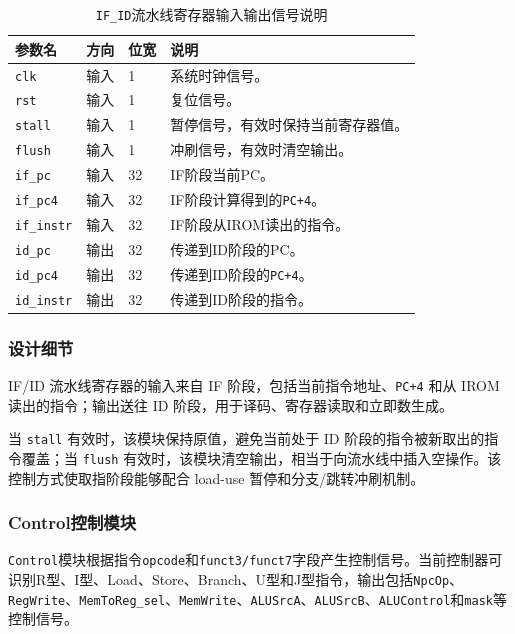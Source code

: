 \documentclass[12pt,a4paper]{ctexart}
\newcommand{\code}[1]{\texttt{#1}}
\begin{document}
\begin{table}[H]
\centering
\caption{\code{IF\_ID}流水线寄存器输入输出信号说明}
\footnotesize
\renewcommand{\arraystretch}{1.15}
\begin{tabularx}{\textwidth}{p{3.2cm}p{1.5cm}p{2.1cm}X}
\toprule
参数名 & 方向 & 位宽 & 说明 \\
\midrule
\code{clk} & 输入 & 1 & 系统时钟信号。 \\
\code{rst} & 输入 & 1 & 复位信号。 \\
\code{stall} & 输入 & 1 & 暂停信号，有效时保持当前寄存器值。 \\
\code{flush} & 输入 & 1 & 冲刷信号，有效时清空输出。 \\
\code{if\_pc} & 输入 & 32 & IF阶段当前PC。 \\
\code{if\_pc4} & 输入 & 32 & IF阶段计算得到的\code{PC+4}。 \\
\code{if\_instr} & 输入 & 32 & IF阶段从IROM读出的指令。 \\
\code{id\_pc} & 输出 & 32 & 传递到ID阶段的PC。 \\
\code{id\_pc4} & 输出 & 32 & 传递到ID阶段的\code{PC+4}。 \\
\code{id\_instr} & 输出 & 32 & 传递到ID阶段的指令。 \\
\bottomrule
\end{tabularx}
\end{table}

\subsubsection*{设计细节}

IF/ID 流水线寄存器的输入来自 IF 阶段，包括当前指令地址、\code{PC+4} 和从 IROM 读出的指令；输出送往 ID 阶段，用于译码、寄存器读取和立即数生成。

当 \code{stall} 有效时，该模块保持原值，避免当前处于 ID 阶段的指令被新取出的指令覆盖；当 \code{flush} 有效时，该模块清空输出，相当于向流水线中插入空操作。该控制方式使取指阶段能够配合 load-use 暂停和分支/跳转冲刷机制。

\subsubsection{Control控制模块}

\code{Control}模块根据指令\code{opcode}和\code{funct3/funct7}字段产生控制信号。当前控制器可识别R型、I型、Load、Store、Branch、U型和J型指令，输出包括\code{NpcOp}、\code{RegWrite}、\code{MemToReg\_sel}、\code{MemWrite}、\code{ALUSrcA}、\code{ALUSrcB}、\code{ALUControl}和\code{mask}等控制信号。
\end{document}
